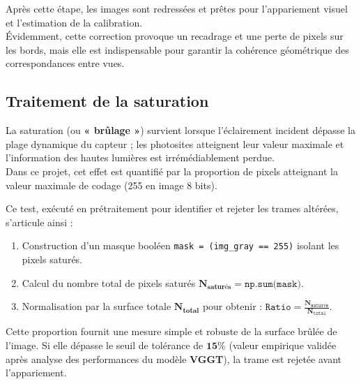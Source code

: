 \documentclass[12pt,a4paper,oneside]{report}
\begin{document}
\bigskip
\bigskip
\bigskip

\hspace*{.5cm} Après cette étape, les images sont redressées et prêtes pour l'appariement visuel et l'estimation de la calibration. \\
Évidemment, cette correction provoque un recadrage et une perte de pixels sur les bords, mais elle est indispensable pour garantir la cohérence géométrique des correspondances entre vues.


\newpage

\subsection{Traitement de la saturation}

\hspace{1cm}La saturation (ou \textbf{« brûlage »}) survient lorsque l'éclairement incident dépasse la plage dynamique du capteur ; les photosites atteignent leur valeur maximale et l'information des hautes lumières est irrémédiablement perdue.\\
\hspace{0.5cm}Dans ce projet, cet effet est quantifié par la proportion de pixels atteignant la valeur maximale de codage (255 en image 8 bits). 

\hspace{0.5cm}Ce test, exécuté en prétraitement pour identifier et rejeter les trames altérées, s'articule ainsi :
\begin{enumerate}[label=\arabic*), leftmargin=2cm, noitemsep, topsep=2pt, itemsep=0.5em]
    \item Construction d'un masque booléen \texttt{mask = (img\_gray == 255)} isolant les pixels saturés.
    \item Calcul du nombre total de pixels saturés $\bm{N_{\text{saturés}}} = \texttt{np.sum(mask)}$.
    \item Normalisation par la surface totale $\bm{N_{\text{total}}}$ pour obtenir : $\bm{\texttt{Ratio} = \frac{N_{\texttt{saturés}}}{N_{\texttt{total}}}}$.
\end{enumerate}
\vspace{0.1cm}

\hspace{1cm}Cette proportion fournit une mesure simple et robuste de la surface brûlée de l'image. Si elle dépasse le seuil de tolérance de $\bm{15\%}$ (valeur empirique validée après analyse des performances du modèle \textbf{VGGT}), la trame est rejetée avant l'appariement.
\end{document}
